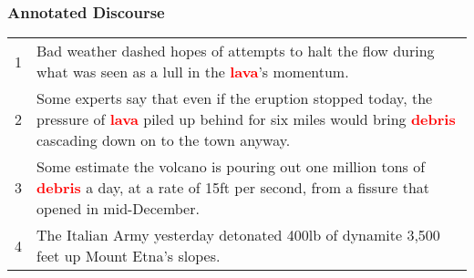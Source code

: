 \documentclass{beamer}
\newcommand{\cent}[1]{\textcolor{red}{#1}}
\begin{document}
\begin{frame}
  \frametitle{Annotated Discourse}
  \begin{exampleblock}{}
    \begin{center}
    \begin{tabularx}{\textwidth}{l@{\hspace{0.5em}}X}
1&      Bad weather dashed hopes of attempts to halt the flow during
      what was seen as a lull in the \cent{\textbf{lava}}'s momentum. \\
2&      Some experts say that even if the eruption stopped today, the
      pressure of \cent{\textbf{lava}} piled up behind for six miles would
      bring
      \cent{\textbf{debris}} cascading down on to the town anyway. \\
3&      Some estimate the volcano is pouring out one million tons of
      \cent{\textbf{debris}} a day, at a rate of 15ft per second, from a
      fissure that
      opened in mid-December. \\
4&      The Italian Army yesterday detonated 400lb of dynamite
      3,500 feet up Mount Etna's slopes. \\
    \end{tabularx}
    \end{center}
  \end{exampleblock}
\end{frame}


\end{document}

